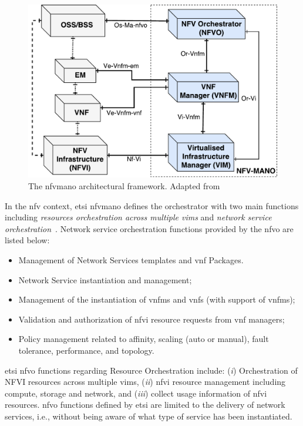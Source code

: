 \begin{figure}[t]
  \centering
  \includegraphics[scale=.45]{Figures/02_Background/fig6.pdf}
    \caption{The \gls{nfvmano} architectural framework. Adapted from \cite{ETSIIndustrySpecificationGroupISGNFV2014NetworkOptions}}
    \label{mano}
\end{figure}

In the \gls{nfv} context, \gls{etsi} \gls{nfvmano} defines the orchestrator with two main functions including \textit{resources orchestration across multiple \glspl{vim}} and \textit{network service orchestration}~\cite{GSNFV-MAN001:2014}. Network service orchestration functions provided by the \gls{nfvo} are listed below:
\begin{itemize}
\item Management of Network Services templates and \gls{vnf} Packages. 
\item Network Service instantiation and management;
\item Management of the instantiation of \glspl{vnfm} and \glspl{vnf} (with support of \glspl{vnfm});
\item Validation and authorization of \gls{nfvi} resource requests from \gls{vnf} managers;
\item Policy management related to affinity, scaling (auto or manual), fault tolerance, performance, and topology.
\end{itemize}

\gls{etsi} \gls{nfvo} functions regarding Resource Orchestration include: (\textit{i})  Orchestration of NFVI resources across multiple \glspl{vim}, (\textit{ii})  \gls{nfvi} resource management including compute, storage and network, and (\textit{iii}) collect usage information of \gls{nfvi} resources. \gls{nfvo} functions defined by \gls{etsi} are limited to the delivery of network services, i.e., without being aware of what type of service has been instantiated.

